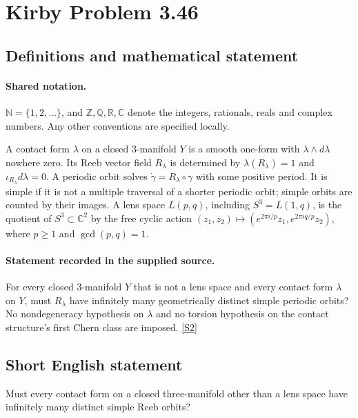\documentclass[11pt]{article}
\newcommand{\sref}[2]{\hyperlink{source:#1:#2}{[S#2]}}
\begin{document}
\section{Kirby Problem 3.46}\label{statement}

\subsection{Definitions and mathematical statement}

\paragraph{Shared notation.}$\mathbb N=\{1,2,\ldots\}$, and $\mathbb Z,\mathbb Q,\mathbb R,\mathbb C$ denote the integers, rationals, reals and complex numbers. Any other conventions are specified locally.


A contact form $\lambda$ on a closed $3$-manifold $Y$ is a smooth one-form with $\lambda\wedge d\lambda$ nowhere zero. Its Reeb vector field $R_\lambda$ is determined by $\lambda(R_\lambda)=1$ and $\iota_{R_\lambda}d\lambda=0$. A periodic orbit solves $\dot\gamma=R_\lambda\circ\gamma$ with some positive period. It is simple if it is not a multiple traversal of a shorter periodic orbit; simple orbits are counted by their images. A lens space $L(p,q)$, including $S^3=L(1,q)$, is the quotient of $S^3\subset\mathbb C^2$ by the free cyclic action $(z_1,z_2)\mapsto(e^{2\pi i/p}z_1,e^{2\pi iq/p}z_2)$, where $p\ge1$ and $\gcd(p,q)=1$.
\paragraph{Statement recorded in the supplied source.}
For every closed $3$-manifold $Y$ that is not a lens space and every contact form $\lambda$ on $Y$, must $R_\lambda$ have infinitely many geometrically distinct simple periodic orbits? No nondegeneracy hypothesis on $\lambda$ and no torsion hypothesis on the contact structure's first Chern class are imposed. \sref{statement}{2}
\subsection{Short English statement}
Must every contact form on a closed three-manifold other than a lens space have infinitely many distinct simple Reeb orbits?
\end{document}
